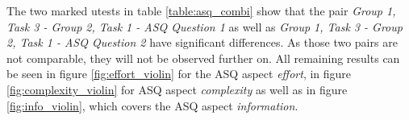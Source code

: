 \begin{table}[htb]
  \caption{Two-sided \gls{utest} for each comparable question on the same device.}
  \label{table:asq_combi}
  \end{table}

The two marked \glspl{utest} in table \ref{table:asq_combi} show that the pair \textit{Group 1, Task 3 - Group 2, Task 1 - ASQ Question 1} as well as \textit{Group 1, Task 3 - Group 2, Task 1 - ASQ Question 2} have significant differences.
As those two pairs are not comparable, they will not be observed further on.
All remaining results can be seen in figure \ref{fig:effort_violin} for the \gls{ASQ} aspect \textit{effort}, in figure \ref{fig:complexity_violin} for \gls{ASQ} aspect \textit{complexity} as well as in figure \ref{fig:info_violin}, which covers the \gls{ASQ} aspect \textit{information}.

